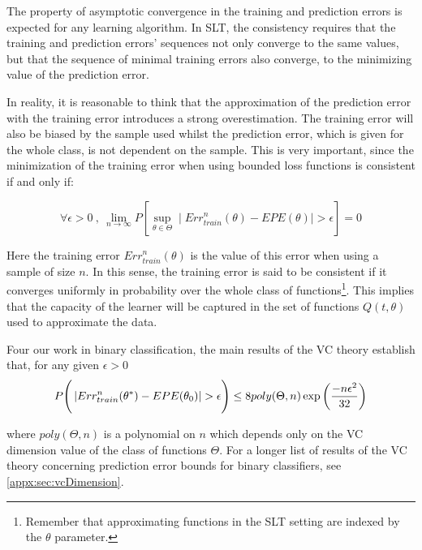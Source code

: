 The property of asymptotic convergence in the training and prediction errors is expected for any learning algorithm.
In SLT, the consistency requires that the training and prediction errors' sequences not only converge to the same values, but that the sequence of minimal training errors also converge, to the minimizing value of the prediction error.

In reality, it is reasonable to think that the approximation of the prediction error with the training error introduces a strong overestimation.
The training error will also be biased by the sample used whilst the prediction error, which is given for the whole class, is not dependent on the sample.
This is very important, since the minimization of the training error when using bounded loss functions is consistent if and only if:


\begin{equation}
\forall \epsilon > 0 \ , \ \lim_{n\to\infty} P\left[ \sup_{\theta \in \Theta} \mid Err^{n}_{train}(\theta) - EPE(\theta) \mid  > \epsilon  \right] = 0
\end{equation}

Here the training error $Err^{n}_{train}(\theta)$ is the value of this error when using a sample of size $n$.
In this sense, the training error is said to be consistent if it converges uniformly in probability over the whole class of functions\footnote{Remember that approximating functions in the SLT setting are indexed by the $\theta$ parameter.}.
This implies that the capacity of the learner will be captured in the set of functions $Q(t,\theta)$ used to approximate the data. 


	Four our work in binary classification, the main results of the VC theory establish that, for any given $\epsilon > 0$ 
\begin{equation}
P\Bigg(  \left|  Err^n_{train}(\theta^*) - EPE(\theta_0) \right| > \epsilon \Bigg)  \leq 8 poly(\Theta,n) \exp{\large \left( {\frac{-n\epsilon^2}{32}} \right)  } 
\end{equation}\label{eq:vapnik-binaryBoundProbability}

where $poly(\Theta,n)$ is a polynomial on $n$ which depends only on the VC dimension value of the class of functions $\Theta$. For a longer list of results of the VC theory concerning prediction error bounds for binary classifiers, see \cref{appx:sec:vcDimension}.

